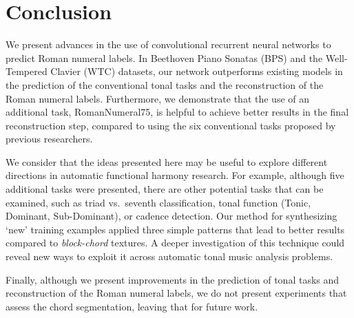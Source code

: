 \documentclass{article}
\begin{document}
\section{Conclusion}
We present advances in the use of convolutional recurrent neural networks to predict Roman numeral labels. 
In Beethoven Piano Sonatas (BPS) and the Well-Tempered Clavier (WTC) datasets, our network outperforms existing models in the prediction of the conventional tonal tasks and the reconstruction of the Roman numeral labels.
Furthermore, we demonstrate that the use of an additional task, RomanNumeral75, is helpful to achieve better results in the final reconstruction step, compared to using the six conventional tasks proposed by previous researchers.



We consider that the ideas presented here may be useful to explore different directions in automatic functional harmony research.
For example, although five additional tasks were presented, there are other potential tasks that can be examined, such as triad vs.~seventh classification, tonal function (Tonic, Dominant, Sub-Dominant), or cadence detection. 
Our method for synthesizing `new' training examples applied three simple patterns that lead to better results compared to \emph{block-chord} textures. A deeper investigation of this technique could reveal new ways to exploit it across automatic tonal music analysis problems.

Finally, although we present improvements in the prediction of tonal tasks and reconstruction of the Roman numeral labels, we do not present experiments that assess the chord segmentation, leaving that for future work.
\end{document}
